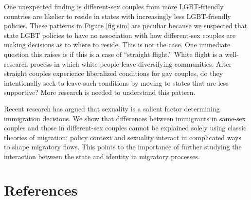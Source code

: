 \documentclass[
  11pt,
]{article}
\begin{document}
One unexpected finding is different-sex couples from more LGBT-friendly countries are likelier to reside in states with increasingly less LGBT-friendly policies. These patterns in Figure \ref{fig:sim} are peculiar because we suspected that state LGBT policies to have no association with how different-sex couples are making decisions as to where to reside. This is not the case. One immediate question this raises is if this is a case of ``straight flight.'' White flight is a well-research process in which white people leave diversifying communities. After straight couples experience liberalized conditions for gay couples, do they intentionally seek to leave such conditions by moving to states that are less supportive? More research is needed to understand this pattern.

Recent research has argued that sexuality is a salient factor determining immigration decisions. We show that differences between immigrants in same-sex couples and those in different-sex couples cannot be explained solely using classic theories of migration; policy context and sexuality interact in complicated ways to shape migratory flows. This points to the importance of further studying the interaction between the state and identity in migratory processes.

\hypertarget{references}{%
\section{References}\label{references}}

\setlength{\parindent}{-0.2in}
\setlength{\leftskip}{0.2in}
\setlength{\parskip}{8pt}

\noindent
\end{document}
